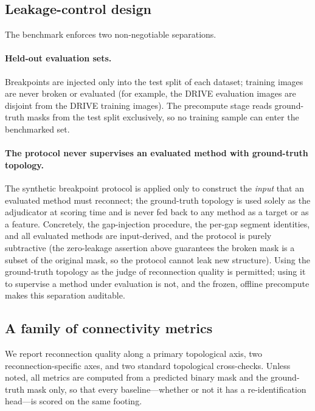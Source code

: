 \subsection{Leakage-control design}
\label{sec:benchmark:leakage}

The benchmark enforces two non-negotiable separations.

\paragraph{Held-out evaluation sets.} Breakpoints are injected only into the
test split of each dataset; training images are never broken or evaluated
(for example, the DRIVE evaluation images are disjoint from the DRIVE
training images). The precompute stage reads ground-truth masks from the test
split exclusively, so no training sample can enter the benchmarked set.

\paragraph{The protocol never supervises an evaluated method with
ground-truth topology.} The synthetic breakpoint protocol is applied only to
construct the \emph{input} that an evaluated method must reconnect; the
ground-truth topology is used solely as the adjudicator at scoring time and is
never fed back to any method as a target or as a feature. Concretely, the
gap-injection procedure, the per-gap segment identities, and all evaluated
methods are input-derived, and the protocol is purely subtractive (the
zero-leakage assertion above guarantees the broken mask is a subset of the
original mask, so the protocol cannot leak new structure). Using the
ground-truth topology as the judge of reconnection quality is permitted;
using it to supervise a method under evaluation is not, and the frozen,
offline precompute makes this separation auditable.

\subsection{A family of connectivity metrics}
\label{sec:benchmark:metrics}

We report reconnection quality along a primary topological axis, two
reconnection-specific axes, and two standard topological cross-checks. Unless
noted, all metrics are computed from a predicted binary mask and the
ground-truth mask only, so that every baseline---whether or not it has a
re-identification head---is scored on the same footing.

